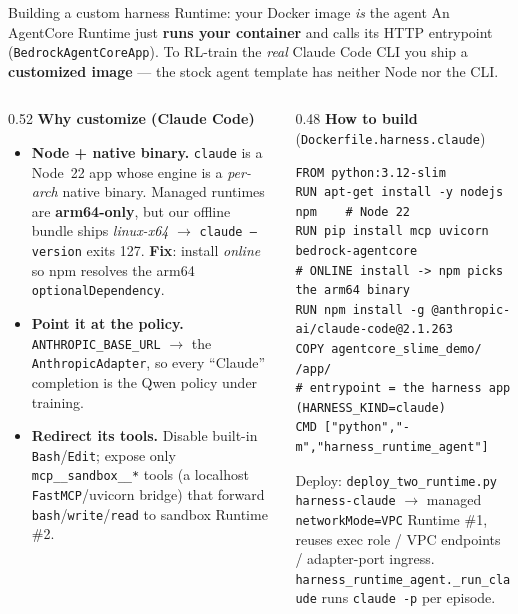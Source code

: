 \documentclass[aspectratio=169]{beamer}
\begin{document}
\begin{frame}[fragile]{Building a custom harness Runtime: your Docker image \emph{is} the agent}
  \footnotesize An AgentCore Runtime just \textbf{runs your container} and calls its HTTP entrypoint
  (\texttt{BedrockAgentCoreApp}). To RL-train the \emph{real} Claude Code CLI you ship a
  \textbf{customized image} --- the stock agent template has neither Node nor the CLI.
  \vspace{0.15em}
  \begin{columns}[T]
    \begin{column}{0.52\textwidth}
      \textbf{Why customize (Claude Code)}
      \begin{itemize}\setlength\itemsep{0.12em}
        \item \textbf{Node + native binary.} \texttt{claude} is a Node~22 app whose engine is a
          \emph{per-arch} native binary. Managed runtimes are \textbf{arm64-only}, but our offline
          bundle ships \emph{linux-x64} $\to$ \texttt{claude --version} exits 127. \textbf{Fix}: install
          \emph{online} so npm resolves the arm64 \texttt{optionalDependency}.
        \item \textbf{Point it at the policy.} \texttt{ANTHROPIC\_BASE\_URL} $\to$ the
          \texttt{AnthropicAdapter}, so every ``Claude'' completion is the Qwen policy under training.
        \item \textbf{Redirect its tools.} Disable built-in \texttt{Bash}/\texttt{Edit}; expose only
          \texttt{mcp\_\_sandbox\_\_*} tools (a localhost \texttt{FastMCP}/uvicorn bridge) that forward
          \texttt{bash}/\texttt{write}/\texttt{read} to sandbox Runtime \#2.
      \end{itemize}
    \end{column}
    \begin{column}{0.48\textwidth}
      \textbf{How to build} (\texttt{Dockerfile.harness.claude})
\begin{lstlisting}[basicstyle=\ttfamily\tiny]
FROM python:3.12-slim
RUN apt-get install -y nodejs npm    # Node 22
RUN pip install mcp uvicorn bedrock-agentcore
# ONLINE install -> npm picks the arm64 binary
RUN npm install -g @anthropic-ai/claude-code@2.1.263
COPY agentcore_slime_demo/ /app/
# entrypoint = the harness app (HARNESS_KIND=claude)
CMD ["python","-m","harness_runtime_agent"]
\end{lstlisting}
      {\tiny Deploy: \texttt{deploy\_two\_runtime.py harness-claude} $\to$ managed
      \texttt{networkMode=VPC} Runtime \#1, reuses exec role / VPC endpoints / adapter-port ingress.
      \texttt{harness\_runtime\_agent.\_run\_claude} runs \texttt{claude -p} per episode.}
    \end{column}
  \end{columns}
\end{frame}
\end{document}
